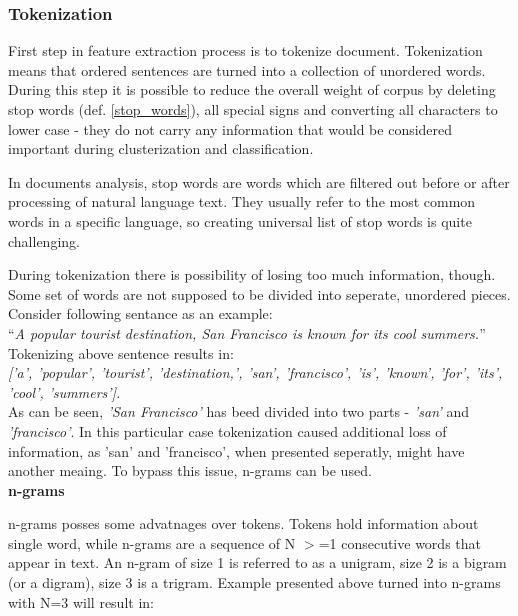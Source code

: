 \subsubsection{Tokenization}
First step in feature extraction process is to tokenize document. Tokenization means that ordered sentences are turned into a collection of unordered words. During this step it is possible to reduce the overall weight of corpus by deleting stop words (def. \ref{stop_words}), all special signs and converting all characters to lower case - they do not carry any information that would be considered important during clusterization and classification.

 \begin{definition}
 	\label{stop_words}
 	In documents analysis, stop words are words which are filtered out before or after processing of natural language text. They usually refer to the most common words in a specific language, so creating universal list of stop words is quite challenging.
 \end{definition}


During tokenization there is possibility of losing too much information, though. Some set of words are not supposed to be divided into seperate, unordered pieces. Consider following sentance as an example:\\

\textquotedblleft \textit{A popular tourist destination, San Francisco is known for its cool summers.}\textquotedblright\\

Tokenizing above sentence results in:\\

\textit{['a', 'popular', 'tourist', 'destination,', 'san', 'francisco', 'is', 'known', 'for', 'its', 'cool', 'summers'].}\\

As can be seen, \textit{'San Francisco'} has beed divided into two parts - \textit{'san'} and \textit{'francisco'}. In this particular case tokenization caused additional loss of information, as 'san' and 'francisco', when presented seperatly, might have another meaing. To bypass this issue, n-grams can be used.\\

\textbf{n-grams}

n-grams posses some advatnages over tokens. Tokens hold information about single word, while n-grams are a sequence of N $>$=1 consecutive words that appear in text. An n-gram of size 1 is referred to as a unigram, size 2 is a bigram (or a digram), size 3 is a trigram. Example presented above turned into n-grams with N=3 will result in:\\

